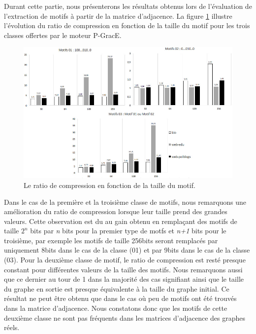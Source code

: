 	Durant cette partie, nous présenterons les résultats obtenus lors de l'évaluation de l'extraction de motifs à partir de la matrice d'adjacence. La figure \ref{fig:test-m} illustre l'évolution du ratio de compression en fonction de la taille du motif pour les trois classes offertes par le moteur P-GracE.
		\begin{figure}[H]
		\begin{center}
		
			\includegraphics[scale=0.55]{ressources/image/m12.jpg}
			
			
			
			\caption{Le ratio de compression en fonction de la taille du motif.}
			\label{fig:test-m}
		\end{center}
	\end{figure}
	
	Dans le cas de la première et la troisième classe de motifs, nous remarquons une amélioration du ratio de compression lorsque leur taille prend des grandes valeurs. Cette observation est du au gain obtenu en remplaçant des motifs de taille $2^n$ bits par \textit{n} bits pour la premier type de motfs et \textit{n+1} bits pour le troisième, par exemple les motifs de taille 256bits seront remplacés par uniquement 8bits dans le cas de la classe (01) et par 9bits dans le cas de la classe (03). Pour la deuxième classe de motif, le ratio de compression est resté presque constant pour différentes valeurs de la taille des motifs. Nous remarquons aussi que ce dernier au tour de 1 dans la majorité des cas signifiant ainsi que le taille du graphe en sortie est presque équivalente à la taille du graphe initial. Ce résultat ne peut être obtenu que dans le cas où peu de motifs ont été trouvés dans la matrice d'adjacence. Nous constatons donc que les motifs de cette deuxième classe ne sont pas fréquents dans les matrices d'adjacence des graphes réels. 
	

